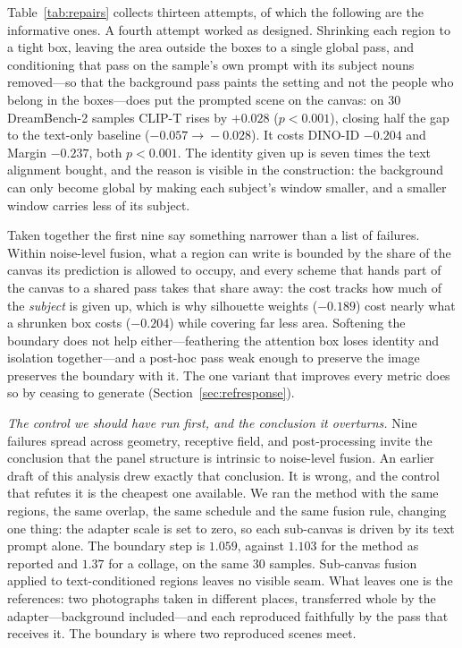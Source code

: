 \documentclass[10pt,twocolumn,letterpaper]{article}
\begin{document}
Table~\ref{tab:repairs} collects thirteen attempts, of which the following are
the informative ones.  A fourth attempt worked as designed.  Shrinking
each region to a tight box, leaving the area outside the boxes to a single
global pass, and conditioning that pass on the sample's own prompt with its
subject nouns removed---so that the background pass paints the setting and
not the people who belong in the boxes---does put the prompted scene on the
canvas: on 30 DreamBench-2 samples CLIP-T rises by $+0.028$
($p{<}0.001$), closing half the gap to the text-only baseline
($-0.057\!\to\!-0.028$).  It costs DINO-ID $-0.204$ and Margin $-0.237$,
both $p{<}0.001$.  The identity given up is seven times the text alignment
bought, and the reason is visible in the construction: the background can
only become global by making each subject's window smaller, and a smaller
window carries less of its subject.

Taken together the first nine say something narrower than a list of
failures.  Within noise-level fusion, what a region can write is bounded by
the share of the canvas its prediction is allowed to occupy, and every scheme
that hands part of the canvas to a shared pass takes that share away: the
cost tracks how much of the \emph{subject} is given up, which is why
silhouette weights ($-0.189$) cost nearly what a shrunken box costs
($-0.204$) while covering far less area.  Softening the boundary does not
help either---feathering the attention box loses identity and isolation
together---and a post-hoc pass weak enough to preserve the image preserves
the boundary with it.  The one variant that improves every metric does so by
ceasing to generate (Section~\ref{sec:refresponse}).

\noindent\textit{The control we should have run first, and the conclusion it
overturns.}
Nine failures spread across geometry, receptive field, and post-processing
invite the conclusion that the panel structure is intrinsic to noise-level
fusion.  An earlier draft of this analysis drew exactly that conclusion.  It
is wrong, and the control that refutes it is the cheapest one available.  We
ran the method with the same regions, the same overlap, the same schedule and
the same fusion rule, changing one thing: the adapter scale is set to zero, so
each sub-canvas is driven by its text prompt alone.  The boundary step is
$1.059$, against $1.103$ for the method as reported and $1.37$ for a collage,
on the same 30 samples.  Sub-canvas fusion applied to text-conditioned regions
leaves no visible seam.  What leaves one is the references: two photographs
taken in different places, transferred whole by the adapter---background
included---and each reproduced faithfully by the pass that receives it.  The
boundary is where two reproduced scenes meet.
\end{document}
